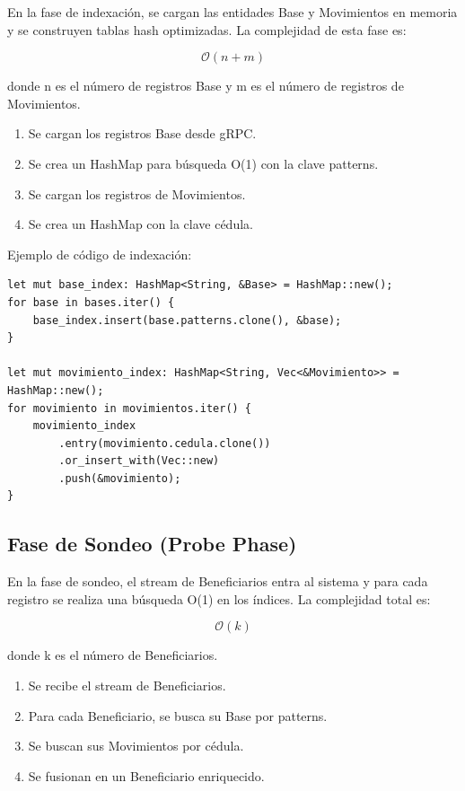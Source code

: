 \bigskip

En la fase de indexación, se cargan las entidades Base y Movimientos en memoria y se construyen tablas hash optimizadas. La complejidad de esta fase es:

\[
\mathcal{O}(n + m)
\]

donde n es el número de registros Base y m es el número de registros de Movimientos.

\bigskip

\begin{enumerate}
    \item Se cargan los registros Base desde gRPC.
    \item Se crea un HashMap para búsqueda O(1) con la clave patterns.
    \item Se cargan los registros de Movimientos.
    \item Se crea un HashMap con la clave cédula.
\end{enumerate}

\bigskip

Ejemplo de código de indexación:
\begin{verbatim}
let mut base_index: HashMap<String, &Base> = HashMap::new();
for base in bases.iter() {
    base_index.insert(base.patterns.clone(), &base);
}

let mut movimiento_index: HashMap<String, Vec<&Movimiento>> = HashMap::new();
for movimiento in movimientos.iter() {
    movimiento_index
        .entry(movimiento.cedula.clone())
        .or_insert_with(Vec::new)
        .push(&movimiento);
}
\end{verbatim}

\bigskip

\subsection{Fase de Sondeo (Probe Phase)}

\bigskip

En la fase de sondeo, el stream de Beneficiarios entra al sistema y para cada registro se realiza una búsqueda O(1) en los índices. La complejidad total es:

\[
\mathcal{O}(k)
\]

donde k es el número de Beneficiarios.

\bigskip

\begin{enumerate}
    \item Se recibe el stream de Beneficiarios.
    \item Para cada Beneficiario, se busca su Base por patterns.
    \item Se buscan sus Movimientos por cédula.
    \item Se fusionan en un Beneficiario enriquecido.
\end{enumerate}


